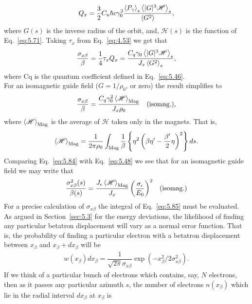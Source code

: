 \begin{align}
	Q_x = \dfrac{3}{2} C_u \hslash c \gamma_0^3 \dfrac{\left< P_\gamma \right>_s \left< |G|^3\mathscr{H} \right>_s}{\left< G^2 \right>},
\end{align}
where $G(s)$ is the inverse radius of the orbit, and, $\mathscr{H}(s)$ is the function of Eq.~\eqref{eq:5.71}. Taking $\tau_x$ from Eq.~\eqref{eq:4.53} we get that
\begin{align}
	\dfrac{\sigma_{x\beta}}{\beta} = \dfrac{1}{4} \tau_x Q_x = \dfrac{C_q \gamma_0 \left< |G|^3\mathscr{H} \right>_s}{J_x \left< G^2 \right>_s},
\end{align}
where Cq is the quantum coefficient defined in Eq.~\eqref{eq:5.46}.\\
For an isomagnetic guide field ($G = 1/\rho_0$, or zero) the result simplifies to
\begin{align}\label{eq:5.84}
	\dfrac{\sigma_{x\beta}}{\beta} =\dfrac{C_q \gamma_0^2 \left< \mathscr{H} \right>_\text{Mag}}{J_x \rho_0} && \text{(isomag.),}
\end{align}
where $\left< \mathscr{H} \right>_\text{Mag}$ is the average of $\mathscr{H}$ taken only in the magnets.
 That is,
\begin{align}\label{eq:5.85}
	\left< \mathscr{H} \right>_\text{Mag} = \dfrac{1}{2\pi\rho_0} \int_\text{Mag} \dfrac{1}{\beta}\left\lbrace \eta^2 \left( \beta\eta' - \dfrac{\beta'}{2} \eta \right)^2 \right\rbrace ds.
\end{align}
Comparing Eq.~\eqref{eq:5.84} with Eq.~\eqref{eq:5.48} we see that for an isomagnetic guide
field we may write that
\begin{align}\label{eq:5.86}
	\dfrac{\sigma_{x\beta}^2(s)}{\beta(s)} =  \dfrac{J_\epsilon \left< \mathscr{H} \right>_\text{Mag}}{J_x} \left( \dfrac{\sigma_\epsilon}{E_0} \right)^2 && \text{(isomag.)}
\end{align}
For a precise calculation of $\sigma_{x\beta}$ the integral of Eq.~\eqref{eq:5.85} must be evaluated.\\
As argued in Section~\ref{sec:5.3} for the energy deviations, the likelihood of finding
any particular betatron displacement will vary as a normal error function. That is, the probability of finding a particular electron with a betatron displacement between $x_\beta$ and $x_\beta + dx_\beta$ will be
\begin{align}
	w(x_\beta)dx_\beta = \dfrac{1}{\sqrt{2\pi} \sigma_{x\beta}} \exp\left( -x_\beta^2/2\sigma_{x\beta}^2 \right).
\end{align}
If we think of a particular bunch of electrons which contains, say, $N$ electrons, then as it passes any particular azimuth $s$, the number of electrons $n(x_\beta)$ which lie in the radial interval $dx_\beta$ at $x_\beta$ is
